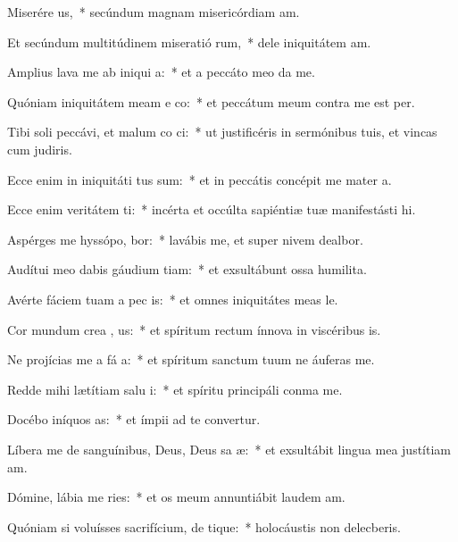 \item Miserére  us,~* secúndum magnam misericórdiam am.
\item Et secúndum multitúdinem miseratió rum,~* dele iniquitátem am.
\item Amplius lava me ab iniqui a:~* et a peccáto meo da me.
\item Quóniam iniquitátem meam e co:~* et peccátum meum contra me est per.
\item Tibi soli peccávi, et malum co  ci:~* ut justificéris in sermónibus tuis, et vincas cum judiris.
\item Ecce enim in iniquitáti tus sum:~* et in peccátis concépit me mater a.
\item Ecce enim veritátem ti:~* incérta et occúlta sapiéntiæ tuæ manifestásti hi.
\item Aspérges me hyssópo,  bor:~* lavábis me, et super nivem dealbor.
\item Audítui meo dabis gáudium  tiam:~* et exsultábunt ossa humilita.
\item Avérte fáciem tuam a pec is:~* et omnes iniquitátes meas le.
\item Cor mundum crea  , us:~* et spíritum rectum ínnova in viscéribus is.
\item Ne projícias me a fá a:~* et spíritum sanctum tuum ne áuferas  me.
\item Redde mihi lætítiam salu i:~* et spíritu principáli conma me.
\item Docébo iníquos  as:~* et ímpii ad te convertur.
\item Líbera me de sanguínibus, Deus, Deus sa æ:~* et exsultábit lingua mea justítiam am.
\item Dómine, lábia me ries:~* et os meum annuntiábit laudem am.
\item Quóniam si voluísses sacrifícium, de tique:~* holocáustis non delecberis.
